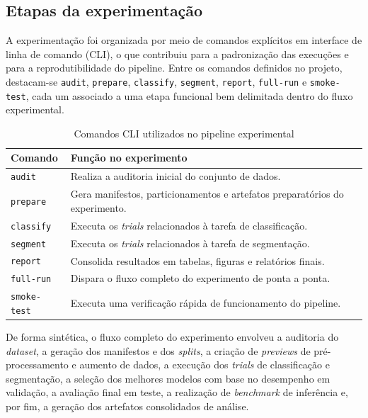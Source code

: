 \documentclass[tcc,capa]{texufpel}
\begin{document}
\subsection{Etapas da experimentação}

A experimentação foi organizada por meio de comandos explícitos em interface de linha de comando (CLI), o que contribuiu para a padronização das execuções e para a reprodutibilidade do pipeline. Entre os comandos definidos no projeto, destacam-se \texttt{audit}, \texttt{prepare}, \texttt{classify}, \texttt{segment}, \texttt{report}, \texttt{full-run} e \texttt{smoke-test}, cada um associado a uma etapa funcional bem delimitada dentro do fluxo experimental.

\begin{table}[htbp]
	\centering
	\caption{Comandos CLI utilizados no pipeline experimental}
	\label{tab:comandos_cli_experimento}
	\begin{tabular}{|p{3.2cm}|p{10.2cm}|}
		\hline
		\textbf{Comando} & \textbf{Função no experimento} \\ \hline
		\texttt{audit} & Realiza a auditoria inicial do conjunto de dados. \\ \hline
		\texttt{prepare} & Gera manifestos, particionamentos e artefatos preparatórios do experimento. \\ \hline
		\texttt{classify} & Executa os \textit{trials} relacionados à tarefa de classificação. \\ \hline
		\texttt{segment} & Executa os \textit{trials} relacionados à tarefa de segmentação. \\ \hline
		\texttt{report} & Consolida resultados em tabelas, figuras e relatórios finais. \\ \hline
		\texttt{full-run} & Dispara o fluxo completo do experimento de ponta a ponta. \\ \hline
		\texttt{smoke-test} & Executa uma verificação rápida de funcionamento do pipeline. \\ \hline
	\end{tabular}
\end{table}

De forma sintética, o fluxo completo do experimento envolveu a auditoria do \textit{dataset}, a geração dos manifestos e dos \textit{splits}, a criação de \textit{previews} de pré-processamento e aumento de dados, a execução dos \textit{trials} de classificação e segmentação, a seleção dos melhores modelos com base no desempenho em validação, a avaliação final em teste, a realização de \textit{benchmark} de inferência e, por fim, a geração dos artefatos consolidados de análise.
\end{document}
